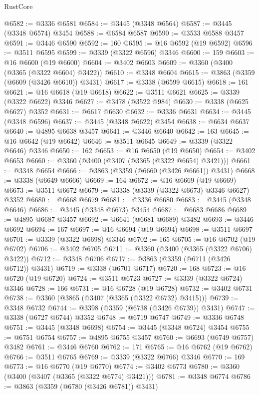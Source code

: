 \begin{lexlean}{RustCore}
\begin{coremodule}
@6582 := @3336 @6581
@6584 := @3445 (@3348 @6564)
@6587 := @3445 (@3348 @6574) @3454
@6588 := @6584 @6587
@6590 := @3533 @6588 @3457
@6591 := @3446 @6590
@6592 := 160
@6595 := @16 @6592 (@19 @6592)
@6596 := @3511 @6595
@6599 := @3339 (@3322 @6596) @3346
@6600 := 159
@6603 := @16 @6600 (@19 @6600)
@6604 := @3402 @6603
@6609 := @3360 (@3400 (@3365 (@3322 @6604) @3422))
@6610 := @3348 @6604
@6615 := @3863 (@3359 (@6609 (@3426 @6610)) @3431)
@6617 := @3338 (@6599 @6615)
@6618 := 161
@6621 := @16 @6618 (@19 @6618)
@6622 := @3511 @6621
@6625 := @3339 (@3322 @6622) @3346
@6627 := @3478 (@3522 @984)
@6630 := @3338 (@6625 @6627) @3352
@6631 := @6617 @6630
@6632 := @3336 @6631
@6634 := @3445 (@3348 @6596)
@6637 := @3445 (@3348 @6622) @3454
@6638 := @6634 @6637
@6640 := @4895 @6638 @3457
@6641 := @3446 @6640
@6642 := 163
@6645 := @16 @6642 (@19 @6642)
@6646 := @3511 @6645
@6649 := @3339 (@3322 @6646) @3346
@6650 := 162
@6653 := @16 @6650 (@19 @6650)
@6654 := @3402 @6653
@6660 := @3360 (@3400 (@3407 (@3365 (@3322 @6654) @3421)))
@6661 := @3348 @6654
@6666 := @3863 (@3359 (@6660 (@3426 @6661)) @3431)
@6668 := @3338 (@6649 @6666)
@6669 := 164
@6672 := @16 @6669 (@19 @6669)
@6673 := @3511 @6672
@6679 := @3338 (@3339 (@3322 @6673) @3346 @6627) @3352
@6680 := @6668 @6679
@6681 := @3336 @6680
@6683 := @3445 (@3348 @6646)
@6686 := @3445 (@3348 @6673) @3454
@6687 := @6683 @6686
@6689 := @4895 @6687 @3457
@6692 := @6641 (@6681 @6689) @3482
@6693 := @3446 @6692
@6694 := 167
@6697 := @16 @6694 (@19 @6694)
@6698 := @3511 @6697
@6701 := @3339 (@3322 @6698) @3346
@6702 := 165
@6705 := @16 @6702 (@19 @6702)
@6706 := @3402 @6705
@6711 := @3360 (@3400 (@3365 (@3322 @6706) @3422))
@6712 := @3348 @6706
@6717 := @3863 (@3359 (@6711 (@3426 @6712)) @3431)
@6719 := @3338 (@6701 @6717)
@6720 := 168
@6723 := @16 @6720 (@19 @6720)
@6724 := @3511 @6723
@6727 := @3339 (@3322 @6724) @3346
@6728 := 166
@6731 := @16 @6728 (@19 @6728)
@6732 := @3402 @6731
@6738 := @3360 (@3865 (@3407 (@3365 (@3322 @6732) @3415)))
@6739 := @3348 @6732
@6744 := @3398 (@3359 (@6738 (@3426 @6739)) @3431)
@6747 := @3338 (@6727 @6744) @3352
@6748 := @6719 @6747
@6749 := @3336 @6748
@6751 := @3445 (@3348 @6698)
@6754 := @3445 (@3348 @6724) @3454
@6755 := @6751 @6754
@6757 := @4895 @6755 @3457
@6760 := @6693 (@6749 @6757) @3482
@6761 := @3446 @6760
@6762 := 171
@6765 := @16 @6762 (@19 @6762)
@6766 := @3511 @6765
@6769 := @3339 (@3322 @6766) @3346
@6770 := 169
@6773 := @16 @6770 (@19 @6770)
@6774 := @3402 @6773
@6780 := @3360 (@3400 (@3407 (@3365 (@3322 @6774) @3421)))
@6781 := @3348 @6774
@6786 := @3863 (@3359 (@6780 (@3426 @6781)) @3431)

\end{coremodule}
\end{lexlean}
